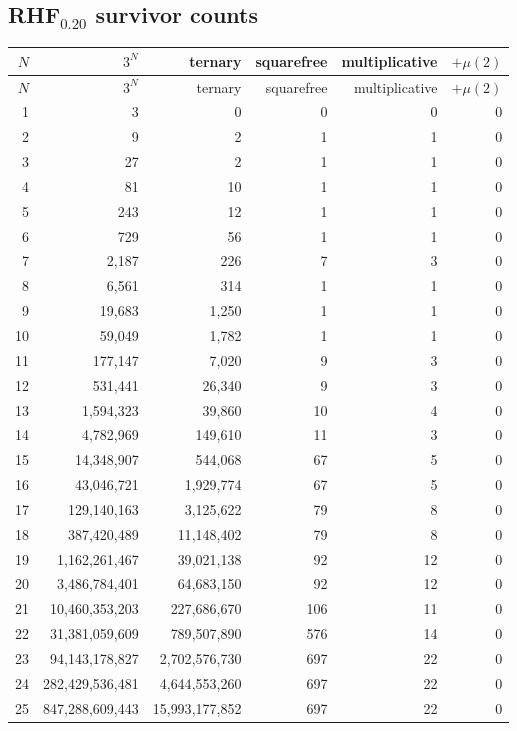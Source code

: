 \documentclass[11pt]{article}
\begin{document}
\subsection{RHF$_{0.20}$ survivor counts}
\begin{center}\scriptsize\begin{longtable}{r r r r r r}
\toprule $N$ & $3^N$ & ternary & squarefree & multiplicative & $+\mu(2)$\\ \midrule\endfirsthead
\toprule $N$ & $3^N$ & ternary & squarefree & multiplicative & $+\mu(2)$\\ \midrule\endhead
1 & 3 & 0 & 0 & 0 & 0\\
2 & 9 & 2 & 1 & 1 & 0\\
3 & 27 & 2 & 1 & 1 & 0\\
4 & 81 & 10 & 1 & 1 & 0\\
5 & 243 & 12 & 1 & 1 & 0\\
6 & 729 & 56 & 1 & 1 & 0\\
7 & 2{,}187 & 226 & 7 & 3 & 0\\
8 & 6{,}561 & 314 & 1 & 1 & 0\\
9 & 19{,}683 & 1{,}250 & 1 & 1 & 0\\
10 & 59{,}049 & 1{,}782 & 1 & 1 & 0\\
11 & 177{,}147 & 7{,}020 & 9 & 3 & 0\\
12 & 531{,}441 & 26{,}340 & 9 & 3 & 0\\
13 & 1{,}594{,}323 & 39{,}860 & 10 & 4 & 0\\
14 & 4{,}782{,}969 & 149{,}610 & 11 & 3 & 0\\
15 & 14{,}348{,}907 & 544{,}068 & 67 & 5 & 0\\
16 & 43{,}046{,}721 & 1{,}929{,}774 & 67 & 5 & 0\\
17 & 129{,}140{,}163 & 3{,}125{,}622 & 79 & 8 & 0\\
18 & 387{,}420{,}489 & 11{,}148{,}402 & 79 & 8 & 0\\
19 & 1{,}162{,}261{,}467 & 39{,}021{,}138 & 92 & 12 & 0\\
20 & 3{,}486{,}784{,}401 & 64{,}683{,}150 & 92 & 12 & 0\\
21 & 10{,}460{,}353{,}203 & 227{,}686{,}670 & 106 & 11 & 0\\
22 & 31{,}381{,}059{,}609 & 789{,}507{,}890 & 576 & 14 & 0\\
23 & 94{,}143{,}178{,}827 & 2{,}702{,}576{,}730 & 697 & 22 & 0\\
24 & 282{,}429{,}536{,}481 & 4{,}644{,}553{,}260 & 697 & 22 & 0\\
25 & 847{,}288{,}609{,}443 & 15{,}993{,}177{,}852 & 697 & 22 & 0\\
\bottomrule\end{longtable}\end{center}
\end{document}
